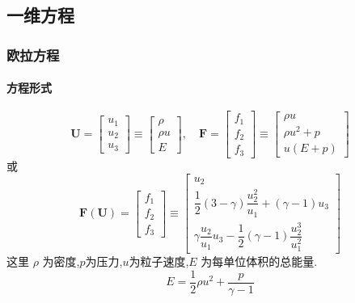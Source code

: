 \documentclass{book}
\begin{document}
\begin{example}
\begin{example}{}{}
\begin{example}
\begin{example}
\begin{example}
\subsection{一维方程}
\subsubsection{欧拉方程}
\paragraph{方程形式}
\begin{equation}
    \mathbf{U}=\left[\begin{array}{l}
            u_{1} \\
            u_{2} \\
            u_{3}
        \end{array}\right] \equiv\left[\begin{array}{c}
            \rho   \\
            \rho u \\
            E
        \end{array}\right], \quad \mathbf{F}=\left[\begin{array}{c}
            f_{1} \\
            f_{2} \\
            f_{3}
        \end{array}\right] \equiv\left[\begin{array}{c}
            \rho u       \\
            \rho u^{2}+p \\
            u(E+p)
        \end{array}\right]
\end{equation}
或
\begin{equation}
    \mathbf{F}(\mathbf{U})=\left[\begin{array}{l}
            f_{1} \\
            f_{2} \\
            f_{3}
        \end{array}\right] \equiv\left[\begin{array}{c}
            u_{2}                                                            \\
            \dfrac{1}{2}(3-\gamma) \dfrac{u_{2}^{2}}{u_{1}}+(\gamma-1) u_{3} \\
            \gamma \dfrac{u_{2}}{u_{1}} u_{3}-\dfrac{1}{2}(\gamma-1) \dfrac{u_{2}^{3}}{u_{1}^{2}}
        \end{array}\right]
\end{equation}
这里 $\rho$ 为密度,$p$为压力,$u$为粒子速度,$E$ 为每单位体积的总能量.
\begin{equation}
    E=\dfrac{1}{2}\rho u^{2}+\frac{p}{\gamma-1}
\end{equation}


\end{example}
\end{example}
\end{example}
\end{example}
\end{example}
\end{document}
